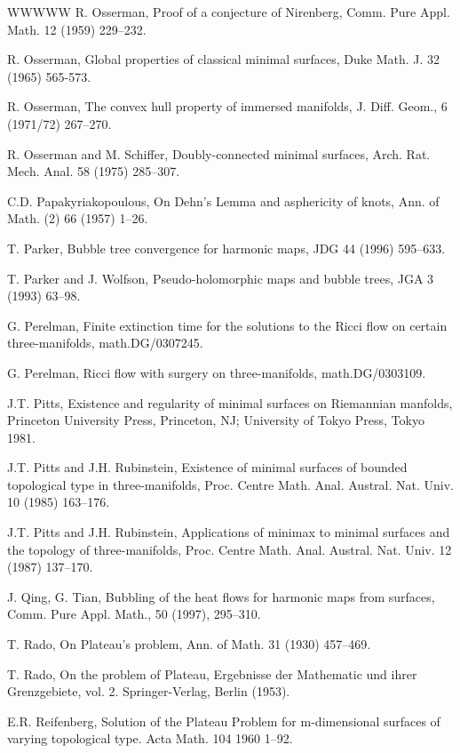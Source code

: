 \begin{thebibliography}{WWWWW}
 R. Osserman, Proof of a conjecture of Nirenberg, Comm. Pure Appl. Math. 12 (1959) 229–232.

 R. Osserman, Global properties of classical minimal surfaces, Duke Math. J. 32 (1965) 565-573.

 R. Osserman, The convex hull property of immersed manifolds, J. Diff. Geom., 6 (1971/72) 267–270.

 R. Osserman and M. Schiffer, Doubly-connected minimal surfaces, Arch. Rat. Mech. Anal. 58 (1975) 285–307.

 C.D. Papakyriakopoulous, On Dehn's Lemma and asphericity of knots, Ann. of Math. (2) 66 (1957) 1–26.

 T. Parker, Bubble tree convergence for harmonic maps, JDG 44 (1996) 595–633.

 T. Parker and J. Wolfson, Pseudo-holomorphic maps and bubble trees, JGA 3 (1993) 63–98.

 G. Perelman, Finite extinction time for the solutions to the Ricci flow on certain three-manifolds, math.DG/0307245.

 G. Perelman, Ricci flow with surgery on three-manifolds, math.DG/0303109.

 J.T. Pitts, Existence and regularity of minimal surfaces on Riemannian manfolds, Princeton University Press, Princeton, NJ; University of Tokyo Press, Tokyo 1981.

 J.T. Pitts and J.H. Rubinstein, Existence of minimal surfaces of bounded topological type in three-manifolds, Proc. Centre Math. Anal. Austral. Nat. Univ. 10 (1985) 163–176.

 J.T. Pitts and J.H. Rubinstein, Applications of minimax to minimal surfaces and the topology of three-manifolds, Proc. Centre Math. Anal. Austral. Nat. Univ. 12 (1987) 137–170.

 J. Qing, G. Tian, Bubbling of the heat flows for harmonic maps from surfaces, Comm. Pure Appl. Math., 50 (1997), 295–310.

 T. Rado, On Plateau's problem, Ann. of Math. 31 (1930) 457–469.

 T. Rado, On the problem of Plateau, Ergebnisse der Mathematic und ihrer Grenzgebiete, vol. 2. Springer-Verlag, Berlin (1953).

 E.R. Reifenberg, Solution of the Plateau Problem for m-dimensional surfaces of varying topological type. Acta Math. 104 1960 1–92.


\end{thebibliography}

